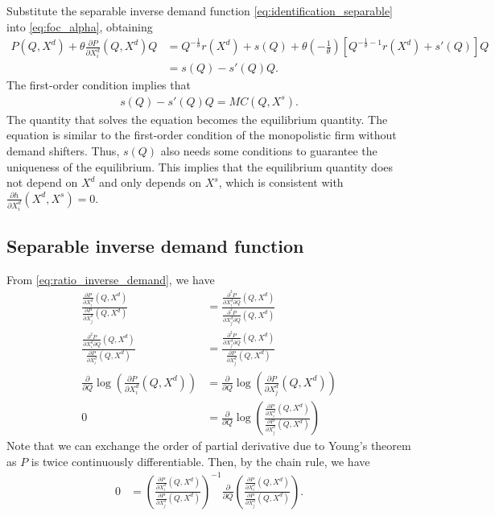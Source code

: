 \documentclass[11pt, a4paper]{article}
\theoremstyle{remark}
\begin{document}
Substitute the separable inverse demand function \eqref{eq:identification_separable} into \eqref{eq:foc_alpha}, obtaining
\begin{align}
    P(Q, X^{d}) + \theta \frac{\partial P}{\partial X_i^{d}} (Q, X^{d}) Q & =  Q^{-\frac{1}{\theta}} r(X^{d}) + s(Q) + \theta \left(-\frac{1}{\theta}\right) \left[  Q^{-\frac{1}{\theta} -1} r(X^{d}) + s'(Q)\right]Q\\
    & = s(Q) - s'(Q)Q.
\end{align}
The first-order condition implies that
\begin{align}
    s(Q) - s'(Q)Q = MC(Q, X^{s}).
\end{align}
The quantity that solves the equation becomes the equilibrium quantity.
The equation is similar to the first-order condition of the monopolistic firm without demand shifters.
Thus, $s(Q)$ also needs some conditions to guarantee the uniqueness of the equilibrium.
This implies that the equilibrium quantity does not depend on $X^{d}$ and only depends on $X^{s}$, which is consistent with $\frac{\partial h}{\partial X^{d}_{i}}(X^{d}, X^{s}) = 0$.


\subsection{Separable inverse demand function}
From \eqref{eq:ratio_inverse_demand}, we have
\begin{align}
    \frac{\frac{\partial P}{\partial X^{d}_{i}}(Q, X^{d})}{\frac{\partial P}{\partial X^{d}_{j}}(Q, X^{d})} & = \frac{ \frac{\partial^2 P}{\partial X^{d}_{i} \partial Q}(Q, X^{d})}{\frac{\partial^2 P}{\partial X^{d}_{j} \partial Q}(Q, X^{d})}\\
    \frac{\frac{\partial^2 P}{\partial X^{d}_{i} \partial Q}(Q, X^{d})}{\frac{\partial P}{\partial X^{d}_{i}}(Q, X^{d})}  & = \frac{\frac{\partial^2 P}{\partial X^{d}_{j} \partial Q}(Q, X^{d})}{\frac{\partial P}{\partial X^{d}_{j}}(Q, X^{d})}\\ 
    \frac{\partial }{\partial Q} \log\left( \frac{\partial P}{\partial X^{d}_{i}}(Q, X^{d})\right) &= \frac{\partial }{\partial Q} \log\left( \frac{\partial P}{\partial X^{d}_{j}}(Q, X^{d})\right)\\
    0& = \frac{\partial}{\partial Q}\log\left(\frac{\frac{\partial P}{\partial X^{d}_{i}}(Q, X^{d})}{\frac{\partial P}{\partial X^{d}_{j}}(Q, X^{d})}\right)
\end{align}
Note that we can exchange the order of partial derivative due to Young's theorem as $P$ is twice continuously differentiable.
Then, by the chain rule, we have
\begin{align}
    0 & = \left(\frac{\frac{\partial P}{\partial X^{d}_{i}}(Q, X^{d})}{\frac{\partial P}{\partial X^{d}_{j}}(Q, X^{d})}\right)^{-1} \frac{\partial}{\partial Q} \left(\frac{\frac{\partial P}{\partial X^{d}_{i}}(Q, X^{d})}{\frac{\partial P}{\partial X^{d}_{j}}(Q, X^{d})}\right).
    \label{eq:derivative_separable}
\end{align}
\end{document}
